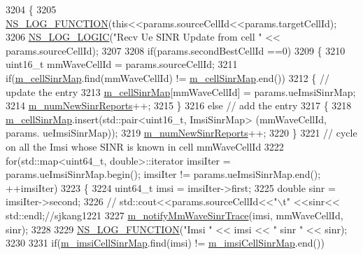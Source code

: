 \begin{DoxyCode}
3204 \{
3205   \hyperlink{log-macros-disabled_8h_a90b90d5bad1f39cb1b64923ea94c0761}{NS\_LOG\_FUNCTION}(\textcolor{keyword}{this}<<params.sourceCellId<<params.targetCellId);
3206   \hyperlink{group__logging_ga88acd260151caf2db9c0fc84997f45ce}{NS\_LOG\_LOGIC}(\textcolor{stringliteral}{"Recv Ue SINR Update from cell "} << params.sourceCellId);
3207 
3208 \textcolor{keywordflow}{if}(params.secondBestCellId ==0)
3209 \{
3210         uint16\_t mmWaveCellId = params.sourceCellId; 
3211         \textcolor{keywordflow}{if}(\hyperlink{classns3_1_1LteEnbRrc_a50206cc0822bd3ec37ef2108735f44f2}{m\_cellSinrMap}.find(mmWaveCellId) != \hyperlink{classns3_1_1LteEnbRrc_a50206cc0822bd3ec37ef2108735f44f2}{m\_cellSinrMap}.end())
3212         \{     \textcolor{comment}{// update the entry}
3213                 \hyperlink{classns3_1_1LteEnbRrc_a50206cc0822bd3ec37ef2108735f44f2}{m\_cellSinrMap}[mmWaveCellId] = params.ueImsiSinrMap;
3214                 \hyperlink{classns3_1_1LteEnbRrc_ab624d5f95716cc624e69f41f430dd8db}{m\_numNewSinrReports}++;
3215         \}
3216         \textcolor{keywordflow}{else}  \textcolor{comment}{// add the entry}
3217         \{
3218                 \hyperlink{classns3_1_1LteEnbRrc_a50206cc0822bd3ec37ef2108735f44f2}{m\_cellSinrMap}.insert(std::pair<uint16\_t, ImsiSinrMap> (mmWaveCellId, params.
      ueImsiSinrMap));
3219                 \hyperlink{classns3_1_1LteEnbRrc_ab624d5f95716cc624e69f41f430dd8db}{m\_numNewSinrReports}++;
3220         \}
3221   \textcolor{comment}{// cycle on all the Imsi whose SINR is known in cell mmWaveCellId}
3222         \textcolor{keywordflow}{for}(std::map<uint64\_t, double>::iterator imsiIter = params.ueImsiSinrMap.begin(); imsiIter != 
      params.ueImsiSinrMap.end(); ++imsiIter)
3223         \{
3224     uint64\_t imsi = imsiIter->first;
3225     \textcolor{keywordtype}{double} sinr = imsiIter->second;
3226    \textcolor{comment}{// std::cout<<params.sourceCellId<<"\(\backslash\)t" <<sinr<< std::endl;//sjkang1221}
3227     \hyperlink{classns3_1_1LteEnbRrc_a9521b7ea53f746753963a62c5b353d43}{m\_notifyMmWaveSinrTrace}(imsi, mmWaveCellId, sinr);
3228     
3229     \hyperlink{log-macros-disabled_8h_a90b90d5bad1f39cb1b64923ea94c0761}{NS\_LOG\_FUNCTION}(\textcolor{stringliteral}{"Imsi "} << imsi << \textcolor{stringliteral}{" sinr "} << sinr);
3230 
3231     \textcolor{keywordflow}{if}(\hyperlink{classns3_1_1LteEnbRrc_a72b3ce5c1f8495e96bfc0f384ecf3a96}{m\_imsiCellSinrMap}.find(imsi) != \hyperlink{classns3_1_1LteEnbRrc_a72b3ce5c1f8495e96bfc0f384ecf3a96}{m\_imsiCellSinrMap}.end())

\end{DoxyCode}
